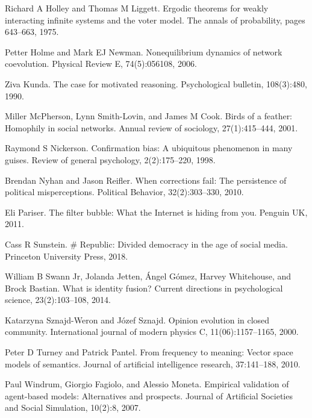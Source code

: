 \documentclass[11pt]{article}
\begin{document}
\begin{thebibliography}{23}
 Richard A Holley and Thomas M Liggett. Ergodic theorems for weakly interacting infinite systems and the voter model. The annals of probability, pages 643–663, 1975.

 Petter Holme and Mark EJ Newman. Nonequilibrium dynamics of network coevolution. Physical Review E, 74(5):056108, 2006.

 Ziva Kunda. The case for motivated reasoning. Psychological bulletin, 108(3):480, 1990.

 Miller McPherson, Lynn Smith-Lovin, and James M Cook. Birds of a feather: Homophily in social networks. Annual review of sociology, 27(1):415–444, 2001.

 Raymond S Nickerson. Confirmation bias: A ubiquitous phenomenon in many guises. Review of general psychology, 2(2):175–220, 1998.

 Brendan Nyhan and Jason Reifler. When corrections fail: The persistence of political misperceptions. Political Behavior, 32(2):303–330, 2010.

 Eli Pariser. The filter bubble: What the Internet is hiding from you. Penguin UK, 2011.

 Cass R Sunstein. \# Republic: Divided democracy in the age of social media. Princeton University Press, 2018.

 William B Swann Jr, Jolanda Jetten, \'Angel G\'omez, Harvey Whitehouse, and Brock Bastian. What is identity fusion? Current directions in psychological science, 23(2):103–108, 2014.

 Katarzyna Sznajd-Weron and J\'ozef Sznajd. Opinion evolution in closed community. International journal of modern physics C, 11(06):1157–1165, 2000.

 Peter D Turney and Patrick Pantel. From frequency to meaning: Vector space models of semantics. Journal of artificial intelligence research, 37:141–188, 2010.

 Paul Windrum, Giorgio Fagiolo, and Alessio Moneta. Empirical validation of agent-based models: Alternatives and prospects. Journal of Artificial Societies and Social Simulation, 10(2):8, 2007.

\end{thebibliography}
\end{document}
